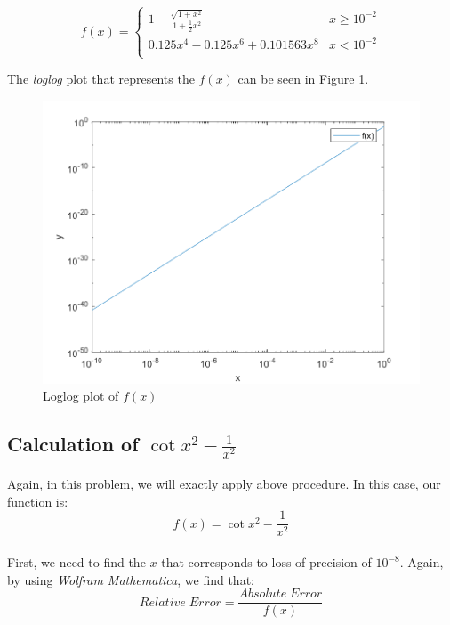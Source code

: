 \documentclass[letterpaper,12pt]{article}
\begin{document}
\[ f(x) = 
\begin{cases}
   1 - \frac{\sqrt{1+x^2}}{1+\frac{1}{2}x^2} & x\geq 10^{-2} \\
   0.125x^4 - 0.125x^6 + 0.101563x^8 &  x < 10^{-2} \\
      
\end{cases} 
 \]

 The \textit{loglog} plot that represents the $f(x)$ can be seen in Figure \ref{fig:loglogb}.

 \begin{figure}[H] 
   \centering \includegraphics[width=\columnwidth]{figures/loglogb.png}           
   \caption{Loglog plot of $f(x)$}                
   \label{fig:loglogb}
   \end{figure}



 \subsection{Calculation of $\cot x^2 - \frac{1}{x^2}$}
 \paragraph{}Again, in this problem, we will exactly apply above procedure. In this case, our function is:
 \begin{equation*}
   f(x) =  \cot x^2 - \frac{1}{x^2}
 \end{equation*}
 \paragraph{} First, we need to find the $x$ that corresponds to loss of precision of $10^{-8}$. Again, by using \textit{Wolfram Mathematica}, we find that:
 \begin{equation*}
    Relative \; Error = \frac{Absolute \; Error}{f(x)}
 \end{equation*}
 
\end{document}
